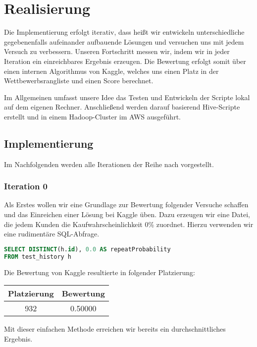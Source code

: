 \section{Realisierung}

Die Implementierung erfolgt iterativ, dass heißt wir entwickeln unterschiedliche gegebenenfalls aufeinander aufbauende Lösungen
und versuchen uns mit jedem Versuch zu verbessern. Unseren Fortschritt messen wir, indem wir in jeder Iteration ein einreichbares Ergebnis erzeugen. Die Bewertung erfolgt somit über einen internen Algorithmus von Kaggle, welches uns einen Platz in der Wettbewerbsrangliste und einen Score berechnet. 

Im Allgemeinen umfasst unsere Idee das Testen und Entwickeln der Scripte lokal auf dem eigenen Rechner. Anschließend werden darauf basierend Hive-Scripte erstellt und in einem Hadoop-Cluster im AWS ausgeführt.

\subsection{Implementierung}
Im Nachfolgenden werden alle Iterationen der Reihe nach vorgestellt. 

\subsubsection{Iteration 0}
\label{sec:iteration0}

Als Erstes wollen wir eine Grundlage zur Bewertung folgender Versuche schaffen und das Einreichen einer
Lösung bei Kaggle üben. Dazu erzeugen wir eine Datei, die jedem Kunden die Kaufwahrscheinlichkeit 0\%
zuordnet. Hierzu verwenden wir eine rudimentäre SQL-Abfrage.

\begin{lstlisting}[language=SQL]
SELECT DISTINCT(h.id), 0.0 AS repeatProbability 
FROM test_history h
\end{lstlisting}

Die Bewertung von Kaggle resultierte in folgender Platzierung:

\begin{tabular}{|c|c|}
	\hline \textbf{Platzierung} & \textbf{Bewertung} \\ 
	\hline 932 & 0.50000  \\ 
	\hline 
\end{tabular}

Mit dieser einfachen Methode erreichen wir bereits ein durchschnittliches Ergebnis.

